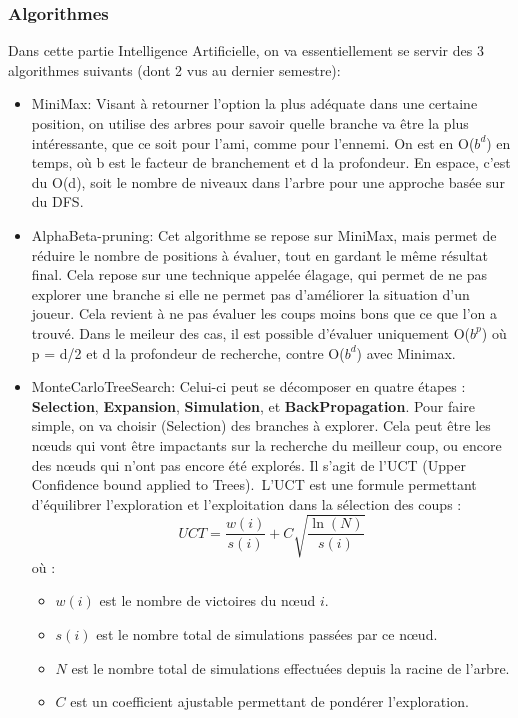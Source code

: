 \documentclass{article}
\begin{document}
\subsubsection{Algorithmes}
Dans cette partie Intelligence Artificielle, on va essentiellement se servir des 3 algorithmes suivants (dont 2 vus au dernier semestre):
\begin{itemize}
    \item MiniMax: Visant à retourner l'option la plus adéquate dans une certaine position, on utilise des arbres pour savoir quelle branche va être la
    plus intéressante, que ce soit pour l'ami, comme pour l'ennemi. On est en O($b^d$) en temps, où b est le facteur de branchement et d la profondeur.
    En espace, c'est du O(d), soit le nombre de niveaux dans l'arbre pour une approche basée sur du DFS.
    \item AlphaBeta-pruning: Cet algorithme se repose sur MiniMax, mais permet de réduire le nombre de positions à évaluer, tout en gardant le même résultat final. 
    Cela repose sur une technique appelée élagage, qui permet de ne pas explorer une branche si elle ne permet pas d'améliorer la situation 
    d'un joueur. Cela revient à ne pas évaluer les coups moins bons que ce que l'on a trouvé. Dans le meileur des cas, il est possible d'évaluer uniquement 
    O($b^p$) où p = d/2 et d la profondeur de recherche, contre O($b^d$) avec Minimax.
    \item MonteCarloTreeSearch:
    Celui-ci peut se décomposer en quatre étapes : \textbf{Selection}, \textbf{Expansion}, \textbf{Simulation}, et \textbf{BackPropagation}. Pour faire simple, on va choisir (Selection) des branches à explorer. Cela peut être les nœuds qui vont être impactants sur la recherche du meilleur coup, ou encore des nœuds qui n'ont pas encore été explorés. Il s'agit de l'UCT (Upper Confidence bound applied to Trees).\
    L'UCT est une formule permettant d'équilibrer l'exploration et l'exploitation dans la sélection des coups :
    \begin{equation}
    UCT = \frac{w(i)}{s(i)} + C \sqrt{\frac{\ln(N)}{s(i)}}
    \end{equation}
    où :
    \begin{itemize}
        \item $w(i)$ est le nombre de victoires du nœud $i$.
        \item $s(i)$ est le nombre total de simulations passées par ce nœud.
        \item $N$ est le nombre total de simulations effectuées depuis la racine de l'arbre.
        \item $C$ est un coefficient ajustable permettant de pondérer l'exploration.\
    \end{itemize} 


\end{itemize}
\end{document}
